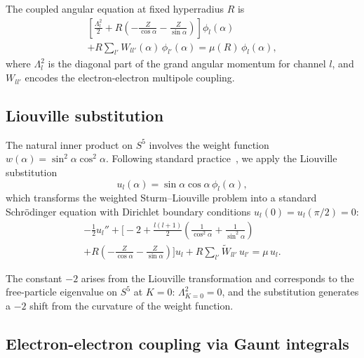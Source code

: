 \documentclass[aps,pra,twocolumn,superscriptaddress,longbibliography]{revtex4-2}
\begin{document}
The coupled angular equation at fixed hyperradius $R$
is~\cite{Macek1968}
\begin{multline}
  \left[\frac{\Lambda^2_l}{2}
  + R\!\left(-\frac{Z}{\cos\alpha} - \frac{Z}{\sin\alpha}\right)
  \right]\!\phi_l(\alpha) \\
  + R\sum_{l'} W_{ll'}(\alpha)\,\phi_{l'}(\alpha)
  = \mu(R)\,\phi_l(\alpha),
  \label{eq:angular_eq}
\end{multline}
where $\Lambda^2_l$ is the diagonal part of the grand angular
momentum for channel $l$, and $W_{ll'}$ encodes the electron-electron
multipole coupling.

\subsection{Liouville substitution}
\label{sec:liouville}

The natural inner product on $S^5$ involves the weight function
$w(\alpha) = \sin^2\!\alpha\cos^2\!\alpha$.  Following standard
practice~\cite{Lin1995}, we apply the Liouville substitution
\begin{equation}
  u_l(\alpha) = \sin\alpha\cos\alpha\,\phi_l(\alpha),
  \label{eq:liouville}
\end{equation}
which transforms the weighted Sturm--Liouville problem into a
standard Schr\"odinger equation with Dirichlet boundary conditions
$u_l(0) = u_l(\pi/2) = 0$:
\begin{multline}
  -\frac{1}{2}u_l''
  + \biggl[-2 + \frac{l(l+1)}{2}
  \!\left(\frac{1}{\cos^2\!\alpha}
  + \frac{1}{\sin^2\!\alpha}\right) \\
  + R\!\left(-\frac{Z}{\cos\alpha}
  - \frac{Z}{\sin\alpha}\right)\biggr]\!u_l
  + R\sum_{l'} \tilde{W}_{ll'}\,u_{l'}
  = \mu\,u_l.
  \label{eq:liouville_eq}
\end{multline}

The constant $-2$ arises from the Liouville transformation and
corresponds to the free-particle eigenvalue on $S^5$ at $K = 0$:
$\Lambda^2_{K=0} = 0$, and the substitution generates a
$-2$ shift from the curvature of the weight function.

\subsection{Electron-electron coupling via Gaunt integrals}
\end{document}
